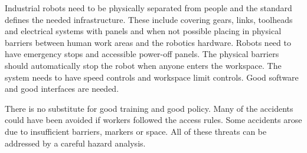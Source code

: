 Industrial robots need to be physically separated from people and the
standard defines the needed infrastructure. These include covering
gears, links, toolheads and electrical systems with panels and when not
possible placing in physical barriers between human work areas and the
robotics hardware. Robots need to have emergency stops and accessible
power-off panels. The physical barriers should automatically stop the
robot when anyone enters the workspace. The system needs to have speed
controls and workspace limit controls. Good software and good interfaces
are needed.

There is no substitute for good training and good policy. Many of the
accidents could have been avoided if workers followed the access rules.
Some accidents arose due to insufficient barriers, markers or space. All
of these threats can be addressed by a careful hazard analysis.
